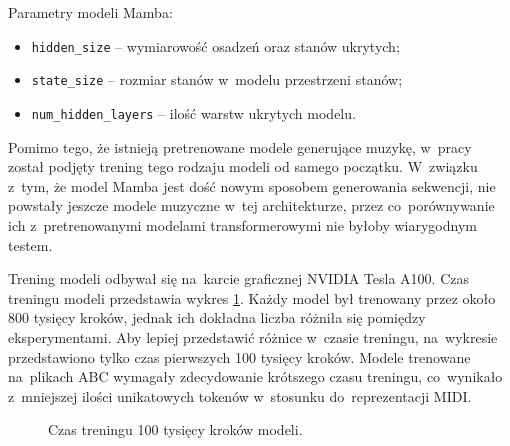 \documentclass[data-science]{agh-wi} %
\begin{document}
Parametry modeli Mamba:
\begin{itemize}
    \item \texttt{hidden\_size} -- wymiarowość osadzeń oraz stanów ukrytych;
    \item \texttt{state\_size} -- rozmiar stanów w~modelu przestrzeni stanów;
    \item \texttt{num\_hidden\_layers} -- ilość warstw ukrytych modelu.
\end{itemize}

Pomimo tego, że istnieją pretrenowane modele generujące muzykę, w~pracy został podjęty trening tego rodzaju modeli od samego początku. W~związku z~tym, że model Mamba jest dość nowym sposobem generowania sekwencji, nie powstały jeszcze modele muzyczne w~tej architekturze, przez co~porównywanie ich z~pretrenowanymi modelami transformerowymi nie byłoby wiarygodnym testem.

Trening modeli odbywał się na~karcie graficznej NVIDIA Tesla A100. Czas treningu modeli przedstawia wykres \ref*{fig:czas_treningu}. Każdy model był trenowany przez około 800 tysięcy kroków, jednak ich dokładna liczba różniła się pomiędzy eksperymentami. Aby lepiej przedstawić różnice w~czasie treningu, na~wykresie przedstawiono tylko czas pierwszych 100 tysięcy kroków. Modele trenowane na~plikach ABC wymagały zdecydowanie krótszego czasu treningu, co~wynikało z~mniejszej ilości unikatowych tokenów w~stosunku do~reprezentacji MIDI.

\begin{figure}[ht!]
    \centering
    \caption{Czas treningu 100 tysięcy kroków modeli.}\label{fig:czas_treningu}
\end{figure}
\end{document}
